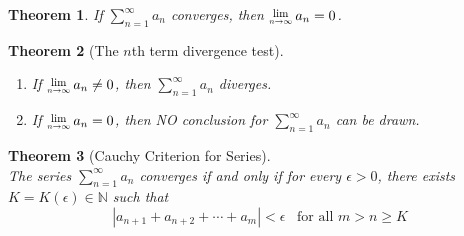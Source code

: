 \documentclass[8pt]{article}
\newcommand{\Lim}[1]{\raisebox{0.5ex}{\scalebox{0.8}{$\displaystyle \lim_{#1}\;$}}}
\newtheorem{theorem}{Theorem}[section]
\theoremstyle{definition}
\begin{document}
\begin{theorem}\normalfont If $\sum_{n=1}^\infty a_n$ converges, then $\Lim{n\to\infty} a_n=0$.
\end{theorem}
\begin{theorem}[The $n$th term divergence test]
\hfill\\\normalfont
\begin{enumerate}
\item If $\Lim{n\to\infty} a_n\neq 0$, then $\sum_{n=1}^\infty a_n$ diverges.
\item If $\Lim{n\to\infty} a_n= 0$, then NO conclusion for $\sum_{n=1}^\infty a_n$ can be drawn.
\end{enumerate}
\end{theorem}
\begin{theorem}[Cauchy Criterion for Series]
\hfill\\\normalfont
The series $\sum_{n=1}^\infty a_n$ converges if and only if for every $\epsilon>0$, there exists $K=K(\epsilon)\in\mathbb{N}$ such that
\[
|a_{n+1}+a_{n+2}+\cdots+a_m|<\epsilon\;\;\;\text{for all }m>n\geq K
\]
\end{theorem}
\end{document}
